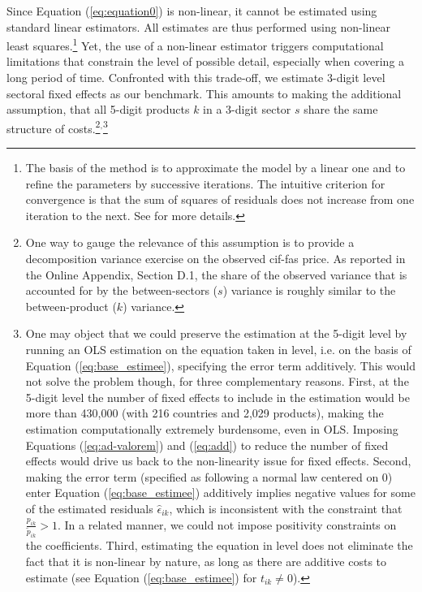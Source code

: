 \documentclass[a4paper,11pt]{article}
\begin{document}
Since Equation (\ref{eq:equation0}) is non-linear, it cannot be estimated using standard linear estimators. All estimates are thus performed using non-linear least squares.\footnote{The basis of the method is to approximate the model by a linear one and to refine the parameters by successive iterations. The intuitive criterion for convergence is that the sum of squares of residuals does not increase from one iteration to the next.
See \cite{Woolridge-Book-2001} for more details.} Yet, the use of a non-linear estimator triggers computational limitations that constrain the level of possible detail, especially when covering a long period of time.
Confronted with this trade-off, we estimate 3-digit level sectoral fixed effects as our benchmark. This amounts to making the additional assumption, that all 5-digit products $k$ in a 3-digit sector $s$ share the same structure of costs.\footnote{One way to gauge the relevance of this assumption is to provide a decomposition variance exercise on the observed cif-fas price.
As reported in the Online Appendix, Section D.1, the share of the observed variance that is accounted for by the between-sectors ($s$) variance is roughly similar to the between-product ($k$) variance.}$^{,}$\footnote{One may object that we could preserve the estimation at the 5-digit level by running an OLS estimation on the equation taken in level, i.e.
on the basis of Equation (\ref{eq:base_estimee}), specifying the error term additively.
This would not solve the problem though, for three complementary reasons.
First, at the 5-digit level the number of fixed effects to include in the estimation would be more than 430,000 (with 216 countries and 2,029 products), making the estimation computationally extremely burdensome, even in OLS.
Imposing Equations (\ref{eq:ad-valorem}) and (\ref{eq:add}) to reduce the number of fixed effects would drive us back to the non-linearity issue for fixed effects.
Second, making the error term (specified as following a normal law centered on 0) enter Equation (\ref{eq:base_estimee}) additively implies negative values for some of the estimated residuals $\widehat{\epsilon}_{ik}$, which is inconsistent with the constraint that $\frac{p_{ik}}{\widetilde{p}_{ik}}>1$. In a related manner, we could not impose positivity constraints on the coefficients. Third, estimating the equation in level does not eliminate the fact that it is non-linear by nature, as long as there are additive costs to estimate (see Equation (\ref{eq:base_estimee}) for $t_{ik} \neq 0$).}
\end{document}
